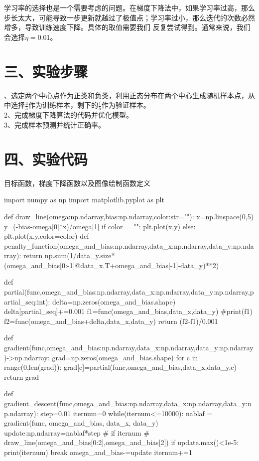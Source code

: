 \documentclass{article}
\begin{document}
学习率的选择也是一个需要考虑的问题。在梯度下降法中，如果学习率过高，那么步长太大，可能导致一步更新就越过了极值点；学习率过小，那么迭代的次数必然增多，导致训练速度下降。具体的取值需要我们
反复尝试得到。通常来说，我们会选择$\eta=0.01$。


\section*{\LARGE 三、实验步骤}、选定两个中心点作为正类和负类，利用正态分布在两个中心生成随机样本点，从中选择$\frac{4}{5}$作为训练样本，剩下的$\frac{1}{5}$作为验证样本。\\
2、完成梯度下降算法的代码并优化模型。\\
3、完成样本预测并统计正确率。


\section*{\LARGE 四、实验代码}\noindent
目标函数，梯度下降函数以及图像绘制函数定义
\begin{python}
import numpy as np
import matplotlib.pyplot as plt

def draw_line(omega:np.ndarray,bias:np.ndarray,color:str=""):
    x=np.linspace(0,5)
    y=(-bias-omega[0]*x)/omega[1]
    if color=="":
        plt.plot(x,y)
    else:
        plt.plot(x,y,color=color)
def penalty_function(omega_and_bias:np.ndarray,data_x:np.ndarray,data_y:np.ndarray):
    return np.sum(1/data_y.size*(omega_and_bias[0:-1]@data_x.T+omega_and_bias[-1]-data_y)**2)

def partial(func,omega_and_bias:np.ndarray,data_x:np.ndarray,data_y:np.ndarray,partial_seq:int):
    delta=np.zeros(omega_and_bias.shape)
    delta[partial_seq]+=0.001
    f1=func(omega_and_bias,data_x,data_y)
    #print(f1)
    f2=func(omega_and_bias+delta,data_x,data_y)
    return (f2-f1)/0.001

def gradient(func,omega_and_bias:np.ndarray,data_x:np.ndarray,data_y:np.ndarray)->np.ndarray:
    grad=np.zeros(omega_and_bias.shape)
    for c in range(0,len(grad)):
        grad[c]=partial(func,omega_and_bias,data_x,data_y,c)
    return grad

def gradient_descent(func,omega_and_bias:np.ndarray,data_x:np.ndarray,data_y:np.ndarray):
    step=0.01
    iternum=0
    while(iternum<=10000):
        nablaf = gradient(func, omega_and_bias, data_x, data_y)
        update:np.ndarray=nablaf*step
        # if iternum%
        #     draw_line(omega_and_bias[0:2],omega_and_bias[2])
        if update.max()<1e-5:
            print(iternum)
            break
        omega_and_bias-=update
        iternum+=1

\end{python}
\end{document}
